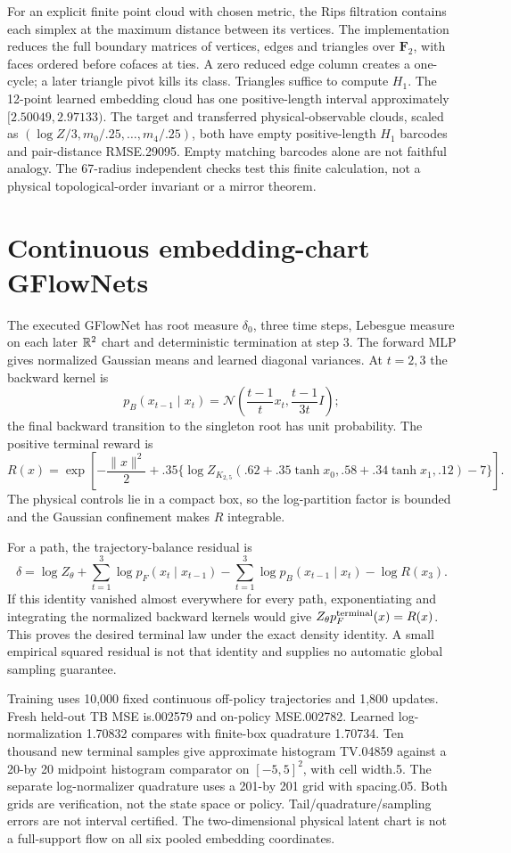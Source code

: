 For an explicit finite point cloud with chosen metric, the Rips filtration
contains each simplex at the maximum distance between its vertices. The
implementation reduces the full boundary matrices of vertices, edges and
triangles over $\mathbf F_2$, with faces ordered before cofaces at ties.
A zero reduced edge column creates a one-cycle; a later triangle pivot
kills its class. Triangles suffice to compute $ H_1$. The 12-point learned
embedding cloud has one positive-length interval approximately
$[2.50049,2.97133)$. The target and transferred physical-observable clouds,
scaled as $(\log Z/3,m_0/.25,\ldots,m_4/.25)$, both have empty positive-length
$ H_1$ barcodes and pair-distance RMSE.29095. Empty matching barcodes alone
are not faithful analogy. The 67-radius independent checks test this finite
calculation, not a physical topological-order invariant or a mirror theorem.

\section{Continuous embedding-chart GFlowNets}
The executed GFlowNet \cite{QContinuousGFN} has root measure $\delta_0$,
three time steps, Lebesgue measure on each later $\mathbb R^2$ chart and deterministic
termination at step 3. The forward MLP gives normalized Gaussian means and
learned diagonal variances. At $ t=2,3$ the backward kernel is
\[
 p_B(x_{t-1}\mid x_t)
 =\mathcal N\!\left(\frac{t-1}{t}x_t,\frac{t-1}{3 t}I\right);
\]
the final backward transition to the singleton root has unit probability.
The positive terminal reward is
\[
 R(x)=\exp\!\left[-\frac{\|x\|^2}{2}
 +.35\{\log Z_{K_{2,5}}(.62+.35\tanh x_0,
                 .58+.34\tanh x_1,.12)-7\}\right].
\]
The physical controls lie in a compact box, so the log-partition factor is
bounded and the Gaussian confinement makes $ R $ integrable.

For a path, the trajectory-balance residual is
\[
 \delta=\log Z_\theta+\sum_{t=1}^3\log p_F(x_t\mid x_{t-1})
             -\sum_{t=1}^3\log p_B(x_{t-1}\mid x_t)-\log R(x_3).
\]
If this identity vanished almost everywhere for every path, exponentiating
and integrating the normalized backward kernels would give
$ Z_\theta p_F^{\rm terminal}(x)=R(x)$. This proves the desired terminal
law under the exact density identity. A small empirical squared residual
is not that identity and supplies no automatic global sampling guarantee.

Training uses 10,000 fixed continuous off-policy trajectories and 1,800
updates. Fresh held-out TB MSE is.002579 and on-policy MSE.002782.
Learned log-normalization 1.70832 compares with finite-box quadrature 1.70734.
Ten thousand new terminal samples give approximate histogram TV.04859
against a 20-by 20 midpoint histogram comparator on $[-5,5]^2$, with cell
width.5. The separate log-normalizer quadrature uses a 201-by 201 grid
with spacing.05. Both grids are verification, not the state space or policy. Tail/quadrature/sampling errors
are not interval certified. The two-dimensional physical latent chart is
not a full-support flow on all six pooled embedding coordinates.

